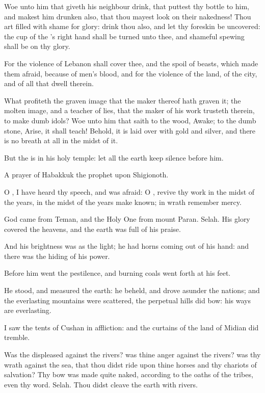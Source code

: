 \Verse Woe unto him that giveth his neighbour drink, that puttest thy bottle to him, and makest him drunken also, that thou mayest look on their nakedness!  \Verse Thou art filled with shame for glory: drink thou also, and let thy foreskin be uncovered: the cup of the \LORD's right hand shall be turned unto thee, and shameful spewing shall be on thy glory.

\Verse For the violence of Lebanon shall cover thee, and the spoil of beasts, which made them afraid, because of men's blood, and for the violence of the land, of the city, and of all that dwell therein.

\Verse What profiteth the graven image that the maker thereof hath graven it; the molten image, and a teacher of lies, that the maker of his work trusteth therein, to make dumb idols?  \Verse Woe unto him that saith to the wood, Awake; to the dumb stone, Arise, it shall teach!  Behold, it is laid over with gold and silver, and there is no breath at all in the midst of it.

\Verse But the \LORD is in his holy temple: let all the earth keep silence before him.


\Chapter
\Verse A prayer of Habakkuk the prophet upon Shigionoth.

\Verse O \LORD, I have heard thy speech, and was afraid: O \LORD, revive thy work in the midst of the years, in the midst of the years make known; in wrath remember mercy.

\Verse God came from Teman, and the Holy One from mount Paran. Selah. His glory covered the heavens, and the earth was full of his praise.

\Verse And his brightness was as the light; he had horns coming out of his hand: and there was the hiding of his power.

\Verse Before him went the pestilence, and burning coals went forth at his feet.

\Verse He stood, and measured the earth: he beheld, and drove asunder the nations; and the everlasting mountains were scattered, the perpetual hills did bow: his ways are everlasting.

\Verse I saw the tents of Cushan in affliction: and the curtains of the land of Midian did tremble.

\Verse Was the \LORD displeased against the rivers? was thine anger against the rivers? was thy wrath against the sea, that thou didst ride upon thine horses and thy chariots of salvation?  \Verse Thy bow was made quite naked, according to the oaths of the tribes, even thy word.  Selah. Thou didst cleave the earth with rivers.

